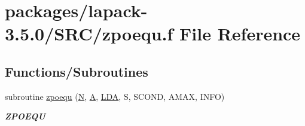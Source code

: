\hypertarget{zpoequ_8f}{}\section{packages/lapack-\/3.5.0/\+S\+R\+C/zpoequ.f File Reference}
\label{zpoequ_8f}
\subsection*{Functions/\+Subroutines}
\begin{DoxyCompactItemize}
\item 
subroutine \hyperlink{group__complex16POcomputational_gab4145122e642dbd9e0c7d21e539932d4}{zpoequ} (\hyperlink{polmisc_8c_a0240ac851181b84ac374872dc5434ee4}{N}, \hyperlink{classA}{A}, \hyperlink{example__user_8c_ae946da542ce0db94dced19b2ecefd1aa}{L\+D\+A}, S, S\+C\+O\+N\+D, A\+M\+A\+X, I\+N\+F\+O)
\begin{DoxyCompactList}\small\item\em {\bfseries Z\+P\+O\+E\+Q\+U} \end{DoxyCompactList}\end{DoxyCompactItemize}
